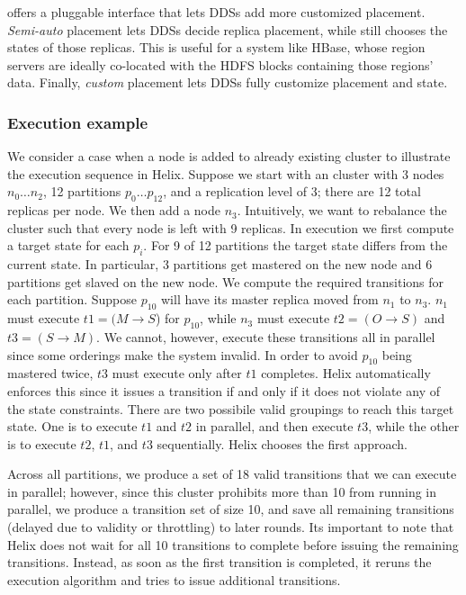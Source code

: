 \helix offers a pluggable interface 
that lets DDSs add more customized placement.  \emph{Semi-auto} placement lets DDSs decide
replica placement, while \helix still chooses the states of those replicas.
This is useful for a system like HBase, whose region servers are ideally
co-located with the HDFS blocks containing those regions' data.  Finally,
\emph{custom} placement lets DDSs fully customize placement and state.


\subsubsection{Execution example}
%
We consider a case when a node is added to already existing
cluster to illustrate the execution sequence in Helix.
Suppose we start with an \ES cluster with 3 nodes $n_0 \ldots n_2$, 12
partitions $p_0 \ldots p_{12}$, and a replication level of 3; there are 12 total
replicas per node.  We then add a node $n_3$. 
Intuitively, we want to rebalance the cluster such that every node is left with
9 replicas.  In \helix execution we first compute a target state for each
$p_i$.  For 9 of 12 partitions the target state differs from the current state.  In
particular, 3 partitions get mastered on the new node and 6 partitions get
slaved on the new node.  We compute the required transitions for each partition.
Suppose $p_{10}$ will have its master replica moved from $n_1$ to $n_3$.  $n_1$
must execute $t1=(M \rightarrow S$) for $p_{10}$, while $n_3$ must execute $t2=(O
\rightarrow S)$ and $t3=(S \rightarrow M)$.  We cannot, however, execute these
transitions all in parallel since some orderings make the system invalid.
In order to avoid $p_{10}$ being mastered twice, $t3$ must execute only after
$t1$ completes. Helix automatically enforces this since it
issues a transition if and only if it does not violate any of the
state constraints. There are two possibile valid groupings to reach this target
state. One is to execute $t1$ and $t2$ in
parallel, and then execute $t3$, while the other is to execute $t2$, $t1$, and $t3$
sequentially. Helix chooses
the first approach.
 
Across all partitions, we produce
a set of 18 valid transitions that we can execute in parallel; however, since 
this \ES cluster prohibits more than 10 from running in parallel, 
we produce a transition set of size 10, and save all remaining transitions
(delayed due to validity or throttling) to later rounds. Its important to note that
Helix does not wait for all 10 transitions to complete before issuing the
remaining transitions. Instead, as soon as the first transition is completed, it
reruns the execution algorithm and tries to issue additional transitions. 

